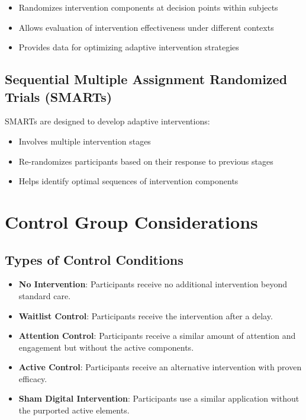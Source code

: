 \begin{itemize}
    \item Randomizes intervention components at decision points within subjects
    \item Allows evaluation of intervention effectiveness under different contexts
    \item Provides data for optimizing adaptive intervention strategies
\end{itemize}

\subsection{Sequential Multiple Assignment Randomized Trials (SMARTs)}
SMARTs are designed to develop adaptive interventions:

\begin{itemize}
    \item Involves multiple intervention stages
    \item Re-randomizes participants based on their response to previous stages
    \item Helps identify optimal sequences of intervention components
\end{itemize}

\section{Control Group Considerations}
\subsection{Types of Control Conditions}
\begin{itemize}
    \item \textbf{No Intervention}: Participants receive no additional intervention beyond standard care.
    \item \textbf{Waitlist Control}: Participants receive the intervention after a delay.
    \item \textbf{Attention Control}: Participants receive a similar amount of attention and engagement but without the active components.
    \item \textbf{Active Control}: Participants receive an alternative intervention with proven efficacy.
    \item \textbf{Sham Digital Intervention}: Participants use a similar application without the purported active elements.
\end{itemize}

